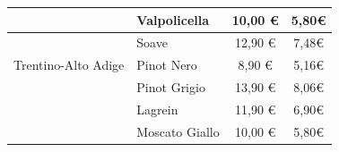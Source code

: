 \documentclass[12pt, a4paper]{article}
\begin{document}
\begin{longtable}{@{}|l|l|c|c|}
& Valpolicella                                                              & 10,00 €                                                         & 5,80€                                                                                 \\ \hline
& Soave                                                                     & 12,90 €                                                         & 7,48€                                                                                 \\ \hline
Trentino-Alto Adige  & Pinot Nero                                                                & 8,90 €                                                          & 5,16€                                                                                 \\ \hline
& Pinot Grigio                                                              & 13,90 €                                                         & 8,06€                                                                                 \\ \hline
& Lagrein                                                                   & 11,90 €                                                         & 6,90€                                                                                 \\ \hline
& Moscato Giallo                                                            & 10,00 €                                                         & 5,80€                                                                                 \\ \hline
\end{longtable}
\end{document}
